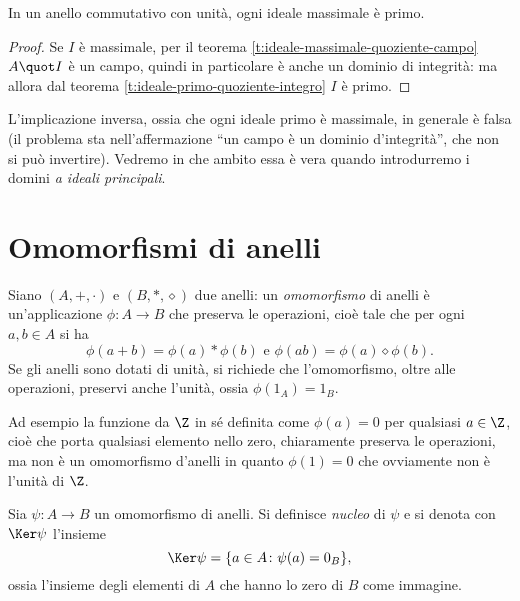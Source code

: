 \begin{corollario} \label{c:ideale-massimale-primo}
	In un anello commutativo con unità, ogni ideale massimale è primo.
\end{corollario}
\begin{proof}
	Se $I$ è massimale, per il teorema \ref{t:ideale-massimale-quoziente-campo} $A\quot I$ è un campo, quindi in particolare è anche un dominio di integrità: ma allora dal teorema \ref{t:ideale-primo-quoziente-integro} $I$ è primo.
\end{proof}
L'implicazione inversa, ossia che ogni ideale primo è massimale, in generale è falsa (il problema sta nell'affermazione ``un campo è un dominio d'integrità'', che non si può invertire).
Vedremo in che ambito essa è vera quando introdurremo i domini \emph{a ideali principali}.

\section{Omomorfismi di anelli}
\begin{definizione} \label{d:omomorfismo-anelli}
	Siano $(A,+,\cdot)$ e $(B,*,\diamond)$ due anelli: un \emph{omomorfismo} di anelli è un'applicazione $\phi\colon A\to B$ che preserva le operazioni, cioè tale che per ogni $a,b\in A$ si ha 
	\begin{equation}
		\phi(a+b)=\phi(a)*\phi(b)\text{ e }\phi(ab)=\phi(a)\diamond\phi(b).
	\end{equation}
	Se gli anelli sono dotati di unità, si richiede che l'omomorfismo, oltre alle operazioni, preservi anche l'unità, ossia $\phi(1_A)=1_B$.
\end{definizione}
Ad esempio la funzione da $\Z$ in s\'e definita come $\phi(a)=0$ per qualsiasi $a\in\Z$, cioè che porta qualsiasi elemento nello zero, chiaramente preserva le operazioni, ma non è un omomorfismo d'anelli in quanto $\phi(1)=0$ che ovviamente non è l'unità di $\Z$.

\begin{definizione} \label{d:nucleo-omomorfismo-anelli}
	Sia $\psi\colon A\to B$ un omomorfismo di anelli. Si definisce \emph{nucleo} di $\psi$ e si denota con $\Ker\psi$ l'insieme
	\begin{equation*}
		\Ker\psi=\{a\in A\colon\psi(a)=0_B\},
	\end{equation*}
	ossia l'insieme degli elementi di $A$ che hanno lo zero di $B$ come immagine.
\end{definizione}

